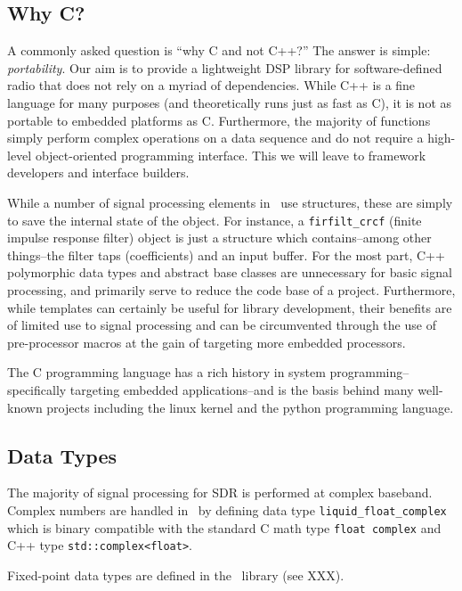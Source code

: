 
\subsection{Why C?}
A commonly asked question is ``why C and not C++?''
The answer is simple: {\em portability}.
Our aim is to provide a lightweight DSP library for software-defined radio
that does not rely on a myriad of dependencies.
While C++ is a fine language for many purposes (and theoretically runs just as
fast as C), it is not as portable to embedded platforms as C.
Furthermore, the majority of functions simply perform complex operations on a
data sequence and do not require a high-level object-oriented programming
interface.
This we will leave to framework developers and interface builders.

While a number of signal processing elements in \liquid\ use structures, these
are simply to save the internal state of the object.
For instance, a {\tt firfilt\_crcf} (finite impulse response filter) object
is just a structure which contains--among other things--the filter taps
(coefficients) and an input buffer.
For the most part, C++ polymorphic data types and abstract base classes are
unnecessary for basic signal processing, and primarily serve to reduce the
code base of a project.
Furthermore, while templates can certainly be useful for library development,
their benefits are of limited use to signal processing and can be circumvented
through the use of pre-processor macros at the gain of targeting more embedded
processors.

The C programming language has a rich history in system programming--
specifically targeting embedded applications--and is the basis behind many
well-known projects including the linux kernel and the python programming
language.

\subsection{Data Types}
The majority of signal processing for SDR is performed at complex baseband.
Complex numbers are handled in \liquid\ by defining data type
{\tt liquid\_float\_complex} which is binary compatible with the standard
C math type {\tt float complex} and C++ type {\tt std::complex<float>}.

Fixed-point data types are defined in the \liquidfpm\ library (see XXX).

